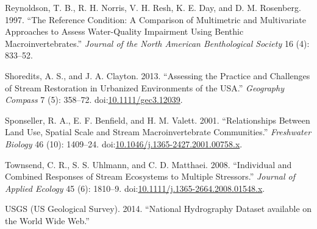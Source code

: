 \documentclass[]{article}
\begin{document}
\hypertarget{ref-Reynoldson97}{}
Reynoldson, T. B., R. H. Norris, V. H. Resh, K. E. Day, and D. M.
Rosenberg. 1997. ``The Reference Condition: A Comparison of Multimetric
and Multivariate Approaches to Assess Water-Quality Impairment Using
Benthic Macroinvertebrates.'' \emph{Journal of the North American
Benthological Society} 16 (4): 833--52.

\hypertarget{ref-Shoredits13}{}
Shoredits, A. S., and J. A. Clayton. 2013. ``Assessing the Practice and
Challenges of Stream Restoration in Urbanized Environments of the USA.''
\emph{Geography Compass} 7 (5): 358--72.
doi:\href{https://doi.org/10.1111/gec3.12039}{10.1111/gec3.12039}.

\hypertarget{ref-Sponseller01}{}
Sponseller, R. A., E. F. Benfield, and H. M. Valett. 2001.
``Relationships Between Land Use, Spatial Scale and Stream
Macroinvertebrate Communities.'' \emph{Freshwater Biology} 46 (10):
1409--24.
doi:\href{https://doi.org/10.1046/j.1365-2427.2001.00758.x}{10.1046/j.1365-2427.2001.00758.x}.

\hypertarget{ref-Townsend08}{}
Townsend, C. R., S. S. Uhlmann, and C. D. Matthaei. 2008. ``Individual
and Combined Responses of Stream Ecosystems to Multiple Stressors.''
\emph{Journal of Applied Ecology} 45 (6): 1810--9.
doi:\href{https://doi.org/10.1111/j.1365-2664.2008.01548.x}{10.1111/j.1365-2664.2008.01548.x}.

\hypertarget{ref-USGS14}{}
USGS (US Geological Survey). 2014. ``National Hydrography Dataset
available on the World Wide Web.''
\end{document}
